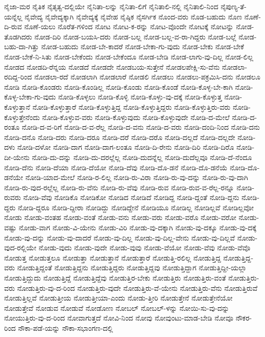 {ನೈಜಾ-ಮರ
ನೈತಿಕ
ನೈತೃತ್ವ-ದಲ್ಲಿಯೇ
ನೈನಿತಾ-ಲನ್ನು
ನೈನಿತಾ-ಲಿಗೆ
ನೈನಿತಾಲಿ-ನಲ್ಲಿ
ನೈನಿತಾಲಿ-ನಿಂದ
ನೈಪುಣ್ಯ-ತೆ-ಯನ್ನೆಲ್ಲ
ನೈವೇದ್ಯ
ನೈವೇದ್ಯಕ್ಕಾಗಿ
ನೈವೇದ್ಯಕ್ಕೆ
ನೈವೇಹ
ನೈಷ್ಠಿಕ
ನೈಸರ್ಗಿಕ
ನೊಂದ-ವರು
ನೊಡ-ಬಹುದು
ನೊಣ
ನೊಣೆ-ದಿ-ರುವ
ನೊಣೆ-ಯಲು
ನೊರೆತ-ಗಳಿಂದ
ನೋಟ
ನೋಟ-ಕ-ರನ್ನು
ನೋಟ-ವೊಂದೇ
ನೋಟಕ್ಕೆ
ನೋಟನ್ನು
ನೋಡ-ತೊಡಗಿದರು
ನೋಡ-ದಿರಿ
ನೋಡ-ಬಯಸಿ-ದರು
ನೋಡ-ಬಲ್ಲ
ನೋಡ-ಬಲ್ಲ-ವ-ರಾ-ಗಿದ್ದರು
ನೋಡ-ಬಲ್ಲೆ
ನೋಡ-ಬಹು-ದಾ-ಗಿತ್ತು
ನೋಡ-ಬಹುದು
ನೋಡ-ಬೇ-ಕಾದರೆ
ನೋಡ-ಬೇಕಾ-ಗು-ವುದು
ನೋಡ-ಬೇಕು
ನೋಡ-ಬೇಕೆ
ನೋಡ-ಬೇಕೆ-ನಿ-ಸಿತು
ನೋಡ-ಬೇಕೆಂದು
ನೋಡ-ಬೇಕೆಂದೂ
ನೋಡ-ಬೇಡಿ
ನೋಡ-ಲಾಗು-ವು-ದಿಲ್ಲ
ನೋಡ-ಲಿಲ್ಲ
ನೋಡದ
ನೋಡದಿ-ರೆನ್ನಯ
ನೋಡದೆ
ನೋಡದೇ
ನೋಡಬಯ-ಸುತ್ತೇನೆ
ನೋಡಲಪೇಕ್ಷಿ-ಸು-ವೆನು
ನೋಡಲಾ-ರದಿದ್ದ-ರಿಂದ
ನೋಡಲಾ-ರದೆ
ನೋಡಲಾಗಿ
ನೋಡಲಾರೆ
ನೋಡಲಿ
ನೋಡಲು
ನೋಡಲು-ಪಕ್ರಮಿಸಿ-ದನು
ನೋಡಲೂ
ನೋಡಿ
ನೋಡಿ-ಕೊಂಡರು
ನೋಡಿ-ಕೊಂಡಿಲ್ಲ
ನೋಡಿ-ಕೊಂಡು
ನೋಡಿ-ಕೊಂಡೆ
ನೋಡಿ-ಕೊಳ್ಳ-ಬೇ-ಕಾಗಿ
ನೋಡಿ-ಕೊಳ್ಳ-ಬೇಕಾ-ಗು-ವುದು
ನೋಡಿ-ಕೊಳ್ಳಲು
ನೋಡಿ-ಕೊಳ್ಳಿ
ನೋಡಿ-ಕೊಳ್ಳು-ವು-ದಕ್ಕೆ
ನೋಡಿ-ಕೊಳ್ಳುತ್ತ
ನೋಡಿ-ಕೊಳ್ಳುತ್ತಾನೆ
ನೋಡಿ-ಕೊಳ್ಳುತ್ತಾರೆ
ನೋಡಿ-ಕೊಳ್ಳುತ್ತಿದ್ದ
ನೋಡಿ-ಕೊಳ್ಳುತ್ತಿದ್ದರು
ನೋಡಿ-ಕೊಳ್ಳುತ್ತಿರು-ವರು
ನೋಡಿ-ಕೊಳ್ಳುತ್ತೇನೆಂದು
ನೋಡಿ-ಕೊಳ್ಳುವ-ವರು
ನೋಡಿ-ಕೊಳ್ಳುವುದು
ನೋಡಿ-ಕೊಳ್ಳುವುದೇ
ನೋಡಿ-ದ-ಮೇಲೆ
ನೋಡಿ-ದ-ರಂತೂ
ನೋಡಿ-ದ-ವ-ರಿಗೆ
ನೋಡಿ-ದ-ವ-ರೆಲ್ಲ
ನೋಡಿ-ದ-ವನು
ನೋಡಿ-ದ-ವರು
ನೋಡಿ-ದಂದಿ-ನಿಂದ
ನೋಡಿ-ದನು
ನೋಡಿ-ದನೊ
ನೋಡಿ-ದರು
ನೋಡಿ-ದರೂ
ನೋಡಿ-ದರೆ
ನೋಡಿ-ದರೊ
ನೋಡಿ-ದಲ್ಲದೆ
ನೋಡಿ-ದಲ್ಲದೇ
ನೋಡಿ-ದಳು
ನೋಡಿ-ದಳೋ
ನೋಡಿ-ದಾಗ
ನೋಡಿ-ದಾಗ-ಲಂತೂ
ನೋಡಿ-ದಿ-ರೇನು
ನೋಡಿ-ದಿರಿ
ನೋಡಿ-ದಿರೊ
ನೋಡಿ-ದೀ-ಯೇನು
ನೋಡಿ-ದು-ದನ್ನು
ನೋಡಿ-ದು-ದರಲ್ಲೆಲ್ಲ
ನೋಡಿ-ದುದನ್ನೆಲ್ಲ
ನೋಡಿ-ದುದೆಲ್ಲವೂ
ನೋಡಿ-ದೆ-ನೆಂದೂ
ನೋಡಿ-ದೆನು
ನೋಡಿ-ದೆಯಾ
ನೋಡಿ-ದೆಯೋ
ನೋಡಿ-ದೆವು
ನೋಡಿ-ದೊ-ಡನೆ
ನೋಡಿ-ದೊ-ಡನೆಯೆ
ನೋಡಿ-ದೊ-ಡನೆಯೇ
ನೋಡಿ-ಯಾದ-ಮೇಲೆ
ನೋಡಿ-ರ-ಲಿಲ್ಲ
ನೋಡಿ-ರು-ವಿರಾ
ನೋಡಿ-ರು-ವು-ದನ್ನು
ನೋಡಿ-ರು-ವು-ದಾಗಿ
ನೋಡಿ-ರು-ವುದ-ರಲ್ಲೆಲ್ಲ
ನೋಡಿ-ರು-ವೆನು
ನೋಡಿ-ರು-ವೆವು
ನೋಡಿ-ರುವ
ನೋಡಿ-ರುವ-ವ-ರೆಲ್ಲ-ರನ್ನೂ
ನೋಡಿ-ರುವರು
ನೋಡಿ-ವೆವು
ನೋಡಿಕೊ
ನೋಡಿಕೋ
ನೋಡಿದ
ನೋಡಿದೆ
ನೋಡಿದ್ದ
ನೋಡಿ-ದ್ದಂತೆ
ನೋಡಿ-ದ್ದನು
ನೋಡಿ-ದ್ದರು
ನೋಡಿ-ದ್ದರೂ
ನೋಡಿ-ದ್ದೀರಾ
ನೋಡಿದ್ದು
ನೋಡಿದ್ದೇನೆ
ನೋಡಿಯೂ
ನೋಡಿಲ್ಲ
ನೋಡಿಲ್ಲವೆ
ನೋಡಿಲ್ಲವೋ
ನೋಡು
ನೋಡು-ವಂತಹ
ನೋಡು-ವಂತೆ
ನೋಡು-ವನು
ನೋಡು-ವರು
ನೋಡು-ವರೊ
ನೋಡು-ವರೋ
ನೋಡು-ವಷ್ಟು
ನೋಡು-ವಾಗ
ನೋಡು-ವಿ-ಯೇನು
ನೋಡು-ವಿರಿ
ನೋಡು-ವು-ದಕ್ಕಾಗಿ
ನೋಡು-ವು-ದಕ್ಕೂ
ನೋಡು-ವು-ದಕ್ಕೆ
ನೋಡು-ವು-ದನ್ನು
ನೋಡು-ವು-ದಾದರೆ
ನೋಡು-ವು-ದಿಲ್ಲ
ನೋಡು-ವು-ದಿಲ್ಲ-ವೇನು
ನೋಡು-ವು-ದಿಲ್ಲವೆ
ನೋಡು-ವುದ-ರಲ್ಲಿಯೇ
ನೋಡು-ವುದು
ನೋಡು-ವುದೇ
ನೋಡು-ವುವು
ನೋಡು-ವೆಯೋ
ನೋಡು-ವೆವು
ನೋಡು-ವೆವೊ
ನೋಡುತ್ತ
ನೋಡುತ್ತಲೂ
ನೋಡುತ್ತಾ
ನೋಡುತ್ತಾನೆ
ನೋಡುತ್ತಾರೆ
ನೋಡುತ್ತಿ-ರಲಿಲ್ಲ
ನೋಡುತ್ತಿದ್ದ
ನೋಡುತ್ತಿದ್ದ-ವರು
ನೋಡುತ್ತಿದ್ದಂತೆ
ನೋಡುತ್ತಿದ್ದನು
ನೋಡುತ್ತಿದ್ದರು
ನೋಡುತ್ತಿದ್ದವು
ನೋಡುತ್ತಿದ್ದಾಗ
ನೋಡುತ್ತಿದ್ದೀ-ಯಲ್ಲಾ
ನೋಡುತ್ತಿದ್ದುದು
ನೋಡುತ್ತಿದ್ದೆ
ನೋಡುತ್ತಿದ್ದೆವು
ನೋಡುತ್ತಿರ-ಬೇಕು
ನೋಡುತ್ತಿರು
ನೋಡುತ್ತಿರು-ವಂತೆ
ನೋಡುತ್ತಿರು-ವರು
ನೋಡುತ್ತಿರು-ವು-ದ-ರಿಂದ
ನೋಡುತ್ತಿರು-ವುದೇ
ನೋಡುತ್ತಿರು-ವೆ-ಯೇನು
ನೋಡುತ್ತಿರು-ವೆನು
ನೋಡುತ್ತಿರುವೆ
ನೋಡುತ್ತಿಲ್ಲವೆ
ನೋಡುತ್ತೀಯ
ನೋಡುತ್ತೀಯಾ-ಎಂದು
ನೋಡು-ತ್ತೀರಿ
ನೋಡುತ್ತೇನೆ
ನೋಡುತ್ತೇನೆಯೋ
ನೋಡುತ್ತೇವೆ
ನೋಡುವ
ನೋಡುವೆ
ನೋಡೋಣ
ನೋಬಲ್
ನೋಬಲ್-ಳನ್ನು
ನೋಯಿ-ಸು-ವು-ದನ್ನು
ನೋಯುತ್ತಿರು-ವು-ದ-ರಿಂದ
ನೋವಾಗುತ್ತದೆ
ನೋವಿ-ನಿಂದ
ನೋವು
ನೋವುಂಟು-ಮಾಡ-ಬೇಡಿ
ನೋವೂ
ನೌಕರ-ರಿಂದ
ನೌಕಾ-ಪಡೆ-ಯನ್ನು
ನೌಕಾ-ಸಭಾಂಗಣ-ದಲ್ಲಿ
}
